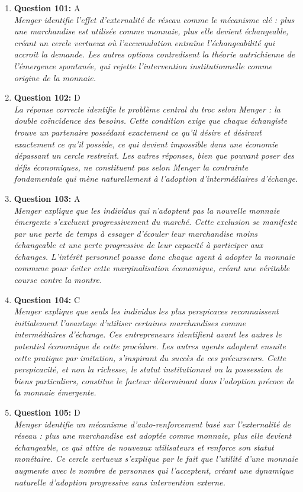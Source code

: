 \documentclass[12pt,a4paper]{article}
\begin{document}
\begin{enumerate}
\item \textbf{Question 101:} A
\\ \textit{Menger identifie l'effet d'externalité de réseau comme le mécanisme clé : plus une marchandise est utilisée comme monnaie, plus elle devient échangeable, créant un cercle vertueux où l'accumulation entraîne l'échangeabilité qui accroît la demande. Les autres options contredisent la théorie autrichienne de l'émergence spontanée, qui rejette l'intervention institutionnelle comme origine de la monnaie.}

\item \textbf{Question 102:} D
\\ \textit{La réponse correcte identifie le problème central du troc selon Menger : la double coïncidence des besoins. Cette condition exige que chaque échangiste trouve un partenaire possédant exactement ce qu'il désire et désirant exactement ce qu'il possède, ce qui devient impossible dans une économie dépassant un cercle restreint. Les autres réponses, bien que pouvant poser des défis économiques, ne constituent pas selon Menger la contrainte fondamentale qui mène naturellement à l'adoption d'intermédiaires d'échange.}

\item \textbf{Question 103:} A
\\ \textit{Menger explique que les individus qui n'adoptent pas la nouvelle monnaie émergente s'excluent progressivement du marché. Cette exclusion se manifeste par une perte de temps à essayer d'écouler leur marchandise moins échangeable et une perte progressive de leur capacité à participer aux échanges. L'intérêt personnel pousse donc chaque agent à adopter la monnaie commune pour éviter cette marginalisation économique, créant une véritable course contre la montre.}

\item \textbf{Question 104:} C
\\ \textit{Menger explique que seuls les individus les plus perspicaces reconnaissent initialement l'avantage d'utiliser certaines marchandises comme intermédiaires d'échange. Ces entrepreneurs identifient avant les autres le potentiel économique de cette procédure. Les autres agents adoptent ensuite cette pratique par imitation, s'inspirant du succès de ces précurseurs. Cette perspicacité, et non la richesse, le statut institutionnel ou la possession de biens particuliers, constitue le facteur déterminant dans l'adoption précoce de la monnaie émergente.}

\item \textbf{Question 105:} D
\\ \textit{Menger identifie un mécanisme d'auto-renforcement basé sur l'externalité de réseau : plus une marchandise est adoptée comme monnaie, plus elle devient échangeable, ce qui attire de nouveaux utilisateurs et renforce son statut monétaire. Ce cercle vertueux s'explique par le fait que l'utilité d'une monnaie augmente avec le nombre de personnes qui l'acceptent, créant une dynamique naturelle d'adoption progressive sans intervention externe.}


\end{enumerate}
\end{document}
